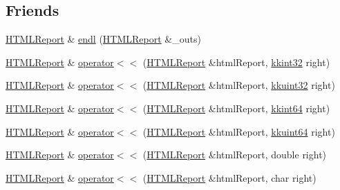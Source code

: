 \subsection*{Friends}
\begin{DoxyCompactItemize}
\item 
\hyperlink{class_k_k_b_1_1_h_t_m_l_report}{H\+T\+M\+L\+Report} \& \hyperlink{class_k_k_b_1_1_h_t_m_l_report_a86572c4fdba3ee50f779d24ffc60c6b3}{endl} (\hyperlink{class_k_k_b_1_1_h_t_m_l_report}{H\+T\+M\+L\+Report} \&\+\_\+outs)
\item 
\hyperlink{class_k_k_b_1_1_h_t_m_l_report}{H\+T\+M\+L\+Report} \& \hyperlink{class_k_k_b_1_1_h_t_m_l_report_a61ae4b98d1b0adcee274d34c79707a98}{operator$<$$<$} (\hyperlink{class_k_k_b_1_1_h_t_m_l_report}{H\+T\+M\+L\+Report} \&html\+Report, \hyperlink{namespace_k_k_b_a8fa4952cc84fda1de4bec1fbdd8d5b1b}{kkint32} right)
\item 
\hyperlink{class_k_k_b_1_1_h_t_m_l_report}{H\+T\+M\+L\+Report} \& \hyperlink{class_k_k_b_1_1_h_t_m_l_report_aad957d794f15a0ca4c1a910e893adaa4}{operator$<$$<$} (\hyperlink{class_k_k_b_1_1_h_t_m_l_report}{H\+T\+M\+L\+Report} \&html\+Report, \hyperlink{namespace_k_k_b_af8d832f05c54994a1cce25bd5743e19a}{kkuint32} right)
\item 
\hyperlink{class_k_k_b_1_1_h_t_m_l_report}{H\+T\+M\+L\+Report} \& \hyperlink{class_k_k_b_1_1_h_t_m_l_report_a0d8387e0c75713d880673a6fbfb5b9f4}{operator$<$$<$} (\hyperlink{class_k_k_b_1_1_h_t_m_l_report}{H\+T\+M\+L\+Report} \&html\+Report, \hyperlink{namespace_k_k_b_aa3486b1c5ea9162b3b020c69f72826eb}{kkint64} right)
\item 
\hyperlink{class_k_k_b_1_1_h_t_m_l_report}{H\+T\+M\+L\+Report} \& \hyperlink{class_k_k_b_1_1_h_t_m_l_report_aeae34097ca63b984926dbe9b7b7414e1}{operator$<$$<$} (\hyperlink{class_k_k_b_1_1_h_t_m_l_report}{H\+T\+M\+L\+Report} \&html\+Report, \hyperlink{namespace_k_k_b_a1f2b0568d3b63cc7697dcff73250113e}{kkuint64} right)
\item 
\hyperlink{class_k_k_b_1_1_h_t_m_l_report}{H\+T\+M\+L\+Report} \& \hyperlink{class_k_k_b_1_1_h_t_m_l_report_aceeec84fe91fd9c5206562de53677418}{operator$<$$<$} (\hyperlink{class_k_k_b_1_1_h_t_m_l_report}{H\+T\+M\+L\+Report} \&html\+Report, double right)
\item 
\hyperlink{class_k_k_b_1_1_h_t_m_l_report}{H\+T\+M\+L\+Report} \& \hyperlink{class_k_k_b_1_1_h_t_m_l_report_a4421832b4cb9b543d0586af3463b2e00}{operator$<$$<$} (\hyperlink{class_k_k_b_1_1_h_t_m_l_report}{H\+T\+M\+L\+Report} \&html\+Report, char right)
\item 

\end{DoxyCompactItemize}
